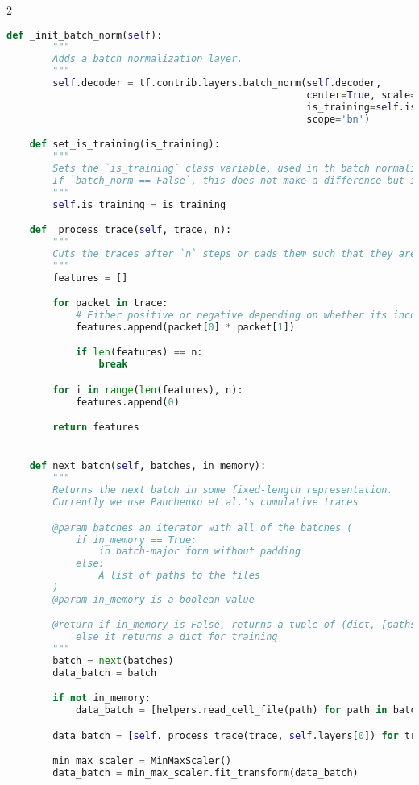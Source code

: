 \begin{landscape}
\begin{multicols}{2}
\begin{lstlisting}[language=Python]
    def _init_batch_norm(self):
        """
        Adds a batch normalization layer.
        """
        self.decoder = tf.contrib.layers.batch_norm(self.decoder,
                                                    center=True, scale=True,
                                                    is_training=self.is_training,
                                                    scope='bn')

    def set_is_training(is_training):
        """
        Sets the `is_training` class variable, used in th batch normalization layer.
        If `batch_norm == False`, this does not make a difference but if it is true, this variable should be set to false after training.
        """
        self.is_training = is_training

    def _process_trace(self, trace, n):
        """
        Cuts the traces after `n` steps or pads them such that they are of length `n`.
        """
        features = []

        for packet in trace:
            # Either positive or negative depending on whether its incoming or outgoing.
            features.append(packet[0] * packet[1])

            if len(features) == n:
                break

        for i in range(len(features), n):
            features.append(0)

        return features


    def next_batch(self, batches, in_memory):
        """
        Returns the next batch in some fixed-length representation.
        Currently we use Panchenko et al.'s cumulative traces

        @param batches an iterator with all of the batches (
            if in_memory == True:
                in batch-major form without padding
            else:
                A list of paths to the files
        )
        @param in_memory is a boolean value

        @return if in_memory is False, returns a tuple of (dict, [paths]) where paths is a list of paths for each batch
            else it returns a dict for training
        """
        batch = next(batches)
        data_batch = batch

        if not in_memory:
            data_batch = [helpers.read_cell_file(path) for path in batch]

        data_batch = [self._process_trace(trace, self.layers[0]) for trace in data_batch]

        min_max_scaler = MinMaxScaler()
        data_batch = min_max_scaler.fit_transform(data_batch)


\end{lstlisting}
\end{multicols}
\end{landscape}

